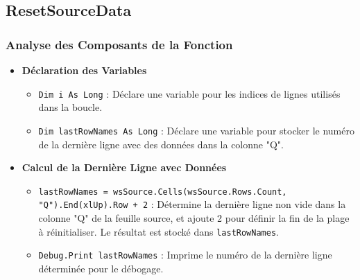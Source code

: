 \documentclass[a4paper, oneside, 12pt, final]{extreport}
\begin{document}
\subsection{ResetSourceData}

\subsubsection{Analyse des Composants de la Fonction}

\begin{itemize}
    \item \textbf{Déclaration des Variables}
    \begin{itemize}
        \item \texttt{Dim i As Long} : Déclare une variable pour les indices de lignes utilisés dans la boucle.
        \item \texttt{Dim lastRowNames As Long} : Déclare une variable pour stocker le numéro de la dernière ligne avec des données dans la colonne "Q".
    \end{itemize}

    \item \textbf{Calcul de la Dernière Ligne avec Données}
    \begin{itemize}
        \item \texttt{lastRowNames = wsSource.Cells(wsSource.Rows.Count, "Q").End(xlUp).Row + 2} : Détermine la dernière ligne non vide dans la colonne "Q" de la feuille source, et ajoute 2 pour définir la fin de la plage à réinitialiser. Le résultat est stocké dans \texttt{lastRowNames}.
        \item \texttt{Debug.Print lastRowNames} : Imprime le numéro de la dernière ligne déterminée pour le débogage.
    \end{itemize}


\end{itemize}
\end{document}
